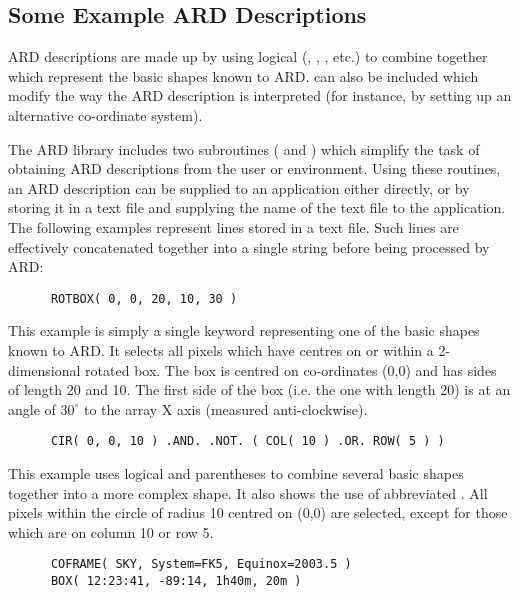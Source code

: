 \subsection{Some Example ARD Descriptions}
ARD descriptions are made up by using logical  
(, , ,
etc.) to combine together  which represent the basic shapes known to ARD.
 can also be included which modify the way the ARD description is
interpreted (for instance, by setting up an alternative co-ordinate system). 

The ARD library includes two subroutines ( and ) which
simplify the task of obtaining ARD descriptions from the user or environment.
Using these routines, an ARD description can be supplied to an application
either directly, or by storing it in a text file and supplying the name of the
text file to the application. The following examples represent lines stored in a
text file. Such lines are effectively concatenated together into a single string
before being processed by ARD: 

\small
\begin{verbatim}
      ROTBOX( 0, 0, 20, 10, 30 )
\end{verbatim}
\normalsize

This example is simply a single keyword representing one of the basic shapes
known to ARD. It selects all pixels which have centres on or within a
2-dimensional rotated box. The box is centred on co-ordinates (0,0) and has
sides of length 20 and 10. The first side of the box (i.e. the one with length 
20) is at an angle of $30^{\circ}$ \hspace{1mm} to the array X axis (measured 
anti-clockwise). 

\small
\begin{verbatim}
      CIR( 0, 0, 10 ) .AND. .NOT. ( COL( 10 ) .OR. ROW( 5 ) )
\end{verbatim}
\normalsize

This example uses logical  and parentheses to combine several basic
shapes together into a more complex shape. It also shows the use of abbreviated
. All pixels within the circle of radius 10 centred on (0,0) are
selected, except for those which are on column 10 or row 5. 

\small
\begin{verbatim}
      COFRAME( SKY, System=FK5, Equinox=2003.5 )
      BOX( 12:23:41, -89:14, 1h40m, 20m ) 
\end{verbatim}
\normalsize

